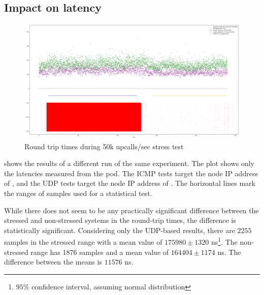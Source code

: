 \subsection{Impact on latency}

\begin{figure}
    \centering
    \includegraphics[width=.9\linewidth]{img/packet_flood_50k_latency.png}
    \caption{Round trip times during 50k upcalls/sec stress test}
    \label{fig:plot-packet-flood-50k-latency}
\end{figure}

 shows the results of a different run of the same experiment. The plot shows only the latencies measured from the  pod. The ICMP tests target the node IP address of , and the UDP tests target the node IP address of . The horizontal lines mark the ranges of samples used for a statistical test.

While there does not seem to be any practically significant difference between the stressed and non-stressed systems in the round-trip times, the difference is statistically significant. Considering only the UDP-based results, there are $2255$ samples in the stressed range with a mean value of $175980 \pm 1320$ \si{\nano\second}\footnote{$95\%$ confidence interval, assuming normal distribution}. The non-stressed range has 1876 samples and a mean value of $164404 \pm 1174$ \si{\nano\second}. The difference between the means is $11576$ \si{\nano\second}.

